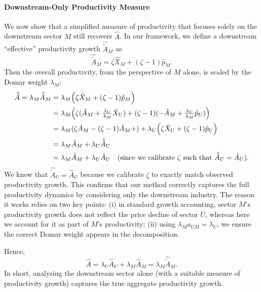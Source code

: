 \documentclass[11pt]{article}
\begin{document}
\paragraph{Downstream-Only Productivity Measure} We now show that a simplified measure of productivity that focuses solely on the downstream sector $M$ still recovers $\hat{A}$. In our framework, we define a downstream ``effective'' productivity growth $\hat{\tilde{A}}_M$ as
\begin{equation*}
    \hat{\tilde{A}}_M =  \zeta \hat{X}_M + (\zeta - 1) \hat{p}_M.
\end{equation*}
Then the overall productivity, from the perspective of $M$ alone, is scaled by the Domar weight $\lambda_M$:
\begin{equation}
    \begin{aligned}
    \hat{\tilde{A}}=\lambda_M  \hat{\tilde{A}}_M 
    &= \lambda_M\Bigl(\zeta \hat{X}_M + (\zeta-1) \hat{p}_M\Bigr)\\
    &= \lambda_M\Bigl(\zeta(\hat{A}_M+ \tfrac{\lambda_U}{\lambda_M} \hat{X}_U )
        +  (\zeta-1) (-\hat{A}_M+\tfrac{\lambda_U}{\lambda_M} \hat{p}_U)\Bigr)\\
    &= \lambda_M (\zeta\hat{A}_M-(\zeta-1)\hat{A}_M+)+\lambda_U\Bigl(\zeta \hat{X}_U + (\zeta-1) \hat{p}_U\Bigr)\\
    &= \lambda_M \hat{A}_M+\lambda_U \hat{\tilde{A}}_U\\
    &=\lambda_M \hat{A}_M+\lambda_U \hat{A}_U\quad(\text{since we calibrate }\zeta\text{ such that }\hat{\tilde{A}}_U=\hat{A}_U).
\end{aligned}
\end{equation}
We know that $\hat{\tilde{A}}_U = \hat{A}_U$ because we calibrate $\zeta$ to exactly match observed productivity growth.
This confirms that our method correctly captures the full productivity dynamics by considering only the downstream industry. The reason it works relies on two key points: (i) in standard growth accounting, sector $M$'s productivity growth does not reflect the price decline of sector $U$, whereas here we account for it as part of $M$'s productivity; (ii) using $\lambda_M a_{UM} = \lambda_U$, we ensure the correct Domar weight appears in the decomposition. 

Hence,
\begin{equation}
      \hat{A}  =  \lambda_U \hat{A}_U+\lambda_M \hat{A}_M 
     =  \lambda_M \hat{\tilde{A}}_M.
\end{equation}
In short, analysing the downstream sector alone (with a suitable measure of productivity growth) captures the true aggregate productivity growth.
\end{document}
